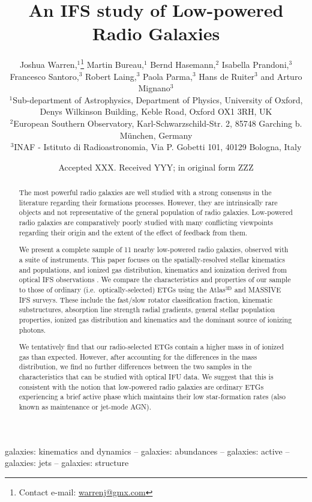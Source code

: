 \documentclass[a4paper,fleqn,usenatbib]{mnras}
\title[An IFS study of Low-powered Radio Galaxies]{An IFS study of Low-powered Radio Galaxies}
\author[J. Warren et al.]{
Joshua Warren,$^{1}$\thanks{Contact e-mail: \href{mailto:warrenj@gmx.com}{warrenj@gmx.com}}
Martin Bureau,$^{1}$
Bernd Hasemann,$^{2}$
Isabella Prandoni,$^{3}$ \newauthor
Francesco Santoro,$^{3}$
Robert Laing,$^{3}$
Paola Parma,$^{3}$
Hans de Ruiter$^{3}$
and \newauthor
Arturo Mignano$^{3}$
\\
$^{1}$Sub-department of Astrophysics, Department of Physics, University of Oxford, Denys Wilkinson Building, Keble Road, Oxford OX1 3RH, UK\\
$^{2}$European Southern Observatory, Karl-Schwarzschild-Str. 2, 85748 Garching b. München, Germany\\
$^{3}$INAF - Istituto di Radioastronomia, Via P. Gobetti 101, 40129 Bologna, Italy}
\date{Accepted XXX. Received YYY; in original form ZZZ}
\begin{document}
\label{firstpage}
\pagerange{\pageref{firstpage}--\pageref{lastpage}}
\maketitle

\begin{abstract}
The most powerful radio galaxies are well studied with a strong consensus in the literature regarding their formations processes. However, they are intrinsically rare objects and not representative of the general population of radio galaxies. Low-powered radio galaxies are comparatively poorly studied with many conflicting viewpoints regarding their origin and the extent of the effect of feedback from them. 

We present a complete sample of 11 nearby low-powered radio galaxies, observed with a suite of instruments. This paper focuses on the spatially-resolved stellar kinematics and populations, and ionized gas distribution, kinematics and ionization derived from optical IFS observations%
. We compare the characteristics and properties of our sample to those of ordinary (i.e.\ optically-selected) ETGs using the Atlas$^\text{3D}$ and MASSIVE IFS surveys. These include the fast/slow rotator classification fraction, kinematic substructures, absorption line strength radial gradients, general stellar population properties, ionized gas distribution and kinematics and the dominant source of ionizing photons.

We tentatively find that our radio-selected ETGs contain a higher mass in of ionized gas than expected. However, after accounting for the differences in the mass distribution, we find no further differences between the two samples in the characteristics that can be studied with optical IFU data. We suggest that this is consistent with the notion that low-powered radio galaxies are ordinary ETGs experiencing a brief active phase which maintains their low star-formation rates (also known as maintenance or jet-mode AGN). 
\end{abstract}

\begin{keywords}
galaxies: kinematics and dynamics -- galaxies: abundances -- galaxies: active -- galaxies: jets -- galaxies: structure
\end{keywords}
\end{document}
